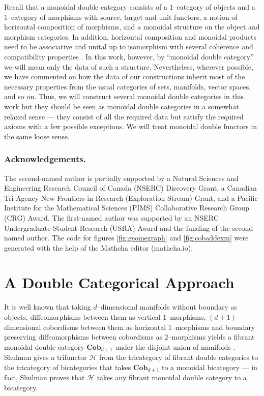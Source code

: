 \documentclass{amsart}
\newcommand{\Cob}{\textbf{Cob}}
\numberwithin{thm}{section}
\theoremstyle{definition}
\begin{document}
Recall that a monoidal double category consists of a $1$--category of objects
and a $1$--category of morphisms with source, target and unit functors, a notion
of horizontal composition of morphisms, and a monoidal structure on the object
and morphism categories. In addition, horizontal composition and monoidal
products need to be associative and unital up to isomorphism with several
coherence and compatibility properties \cite{SymMonBicat}. In this work,
however, by ``monoidal double category'' we will mean only the data of such a
structure. Nevertheless, wherever possible, we have commented on how the data of
our constructions inherit most of the necessary properties from the usual
categories of sets, manifolds, vector spaces, and so on. Thus, we will construct
several monoidal double categories in this work but they should be seen as
monoidal double categories in a somewhat relaxed sense --- they consist of all
the required data but satisfy the required axioms with a few possible
exceptions. We will treat monoidal double functors in the same loose sense.

\subsubsection*{Acknowledgements.}

The second-named author is partially supported by a Natural Sciences and Engineering Research Council of Canada (NSERC) Discovery Grant, a Canadian Tri-Agency New Frontiers in Research (Exploration Stream) Grant, and a Pacific Institute for the Mathematical Sciences (PIMS) Collaborative Research Group (CRG) Award. The first-named author was supported by an NSERC Undergraduate Student Research (USRA) Award and the funding of the second-named author. The code for figures \ref{fig:geomegraph} and \ref{fig:cobaddexm} were generated with the help of the Mathcha editor (mathcha.io).

%

\section{A Double Categorical Approach}

It is well known that taking $d$--dimensional manifolds without boundary as
objects, diffeomorphisms between them as vertical $1$--morphisms, $(d +
1)$--dimensional cobordisms between them as horizontal $1$--morphisms and
boundary preserving diffeomorphisms between cobordisms as $2$--morphisms yields
a fibrant monoidal double category $\Cob_{d + 1}$ under the disjoint union of
manifolds \cite{SymMonBicat}. Shulman gives a trifunctor $\mathcal{H}$ from the
tricategory of fibrant double categories to the tricategory of bicategories that
takes $\Cob_{d + 1}$ to a monoidal bicategory --- in fact, Shulman proves that
$\mathcal{H}$ takes any fibrant monoidal double category to a bicategory.
\end{document}
